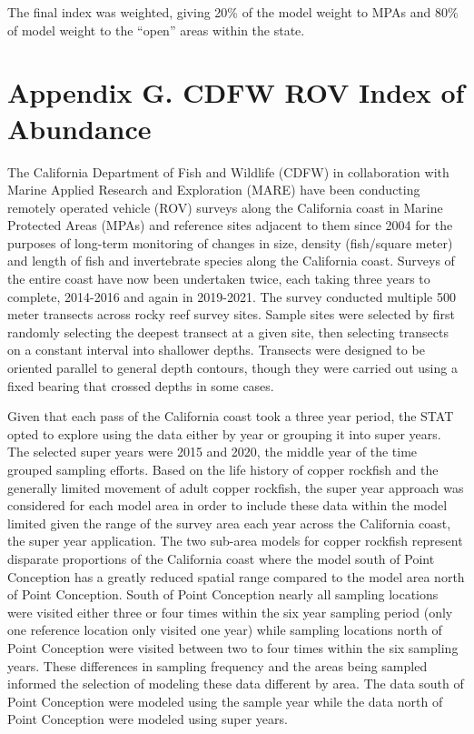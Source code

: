 \documentclass[11pt,
  english,
  letterpaper,
]{article}
\begin{document}
The final index was weighted, giving 20\% of the model weight to MPAs and 80\% of model weight to the ``open'' areas within the state.

\hypertarget{cdfw-rov-index}{%
\section{Appendix G. CDFW ROV Index of Abundance}\label{cdfw-rov-index}}

The California Department of Fish and Wildlife (CDFW) in collaboration with Marine Applied Research and Exploration (MARE) have been conducting remotely operated vehicle (ROV) surveys along the California coast in Marine Protected Areas (MPAs) and reference sites adjacent to them since 2004 for the purposes of long-term monitoring of changes in size, density (fish/square meter) and length of fish and invertebrate species along the California coast. Surveys of the entire coast have now been undertaken twice, each taking three years to complete, 2014-2016 and again in 2019-2021. The survey conducted multiple 500 meter transects across rocky reef survey sites. Sample sites were selected by first randomly selecting the deepest transect at a given site, then selecting transects on a constant interval into shallower depths. Transects were designed to be oriented parallel to general depth contours, though they were carried out using a fixed bearing that crossed depths in some cases.

Given that each pass of the California coast took a three year period, the STAT opted to explore using the data either by year or grouping it into super years. The selected super years were 2015 and 2020, the middle year of the time grouped sampling efforts. Based on the life history of copper rockfish and the generally limited movement of adult copper rockfish, the super year approach was considered for each model area in order to include these data within the model limited given the range of the survey area each year across the California coast, the super year application. The two sub-area models for copper rockfish represent disparate proportions of the California coast where the model south of Point Conception has a greatly reduced spatial range compared to the model area north of Point Conception. South of Point Conception nearly all sampling locations were visited either three or four times within the six year sampling period (only one reference location only visited one year) while sampling locations north of Point Conception were visited between two to four times within the six sampling years. These differences in sampling frequency and the areas being sampled informed the selection of modeling these data different by area. The data south of Point Conception were modeled using the sample year while the data north of Point Conception were modeled using super years.
\end{document}
